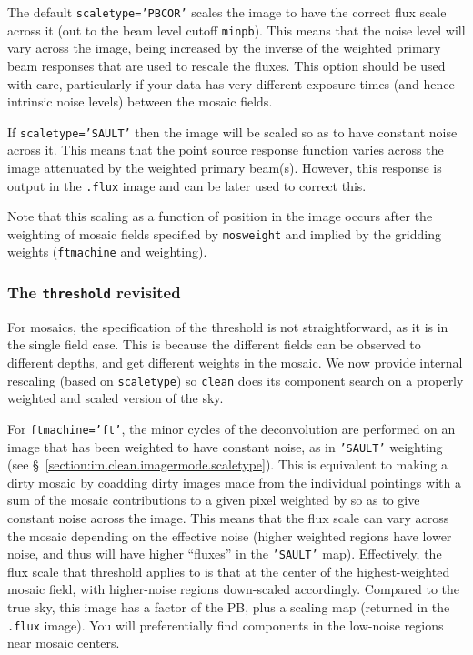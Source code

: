 The default {\tt scaletype='PBCOR'} scales the
image to have the correct flux scale across it (out to the beam
level cutoff {\tt minpb}).  This means that the noise level will
vary across the image, being increased by the inverse of the 
weighted primary beam responses that are used to rescale the
fluxes.  This option should
be used with care, particularly if your data has very different exposure
times (and hence intrinsic noise levels) between the mosaic fields.

If {\tt scaletype='SAULT'} then the image will be scaled so as to have
constant noise across it.  This means that the point source response
function varies across the image attenuated by the weighted primary
beam(s).  However, this response is output in the {\tt .flux} image
and can be later used to correct this.

Note that this scaling as a function of position in the image occurs
after the weighting of mosaic fields specified by {\tt mosweight}
and implied by the gridding weights ({\tt ftmachine} and {weighting}).

\subsubsection{The {\tt threshold} revisited}
\label{section:im.clean.imagermode.threshold}

For mosaics, the specification of the threshold is not
straightforward, as it is in the single field case.  This is because
the different fields can be observed to different depths, and get
different weights in the mosaic.  We now provide internal rescaling
(based on {\tt scaletype}) so {\tt clean} does
its component search on a properly weighted and scaled version of the sky.

For {\tt ftmachine='ft'}, the minor cycles of the deconvolution are
performed on an image that has been weighted to have constant noise,
as in {\tt 'SAULT'} weighting (see
\S~\ref{section:im.clean.imagermode.scaletype}).  This is equivalent to making
a dirty mosaic by coadding dirty images made from the individual 
pointings with a sum of the mosaic contributions to a given pixel
weighted by so as to give constant noise across the image.
This means that the flux scale can vary across the mosaic depending
on the effective noise (higher weighted regions have lower noise, and
thus will have higher ``fluxes'' in the {\tt 'SAULT'} map).  Effectively,
the flux scale that threshold applies to is that at the center of the
highest-weighted mosaic field, with higher-noise regions down-scaled
accordingly.  Compared to the true sky, this image has a factor of
the PB, plus a scaling map (returned in the {\tt .flux} image).
You will preferentially find components in the low-noise
regions near mosaic centers.

